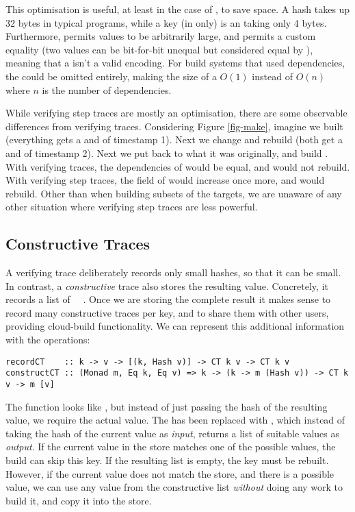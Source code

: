 This optimisation is useful, at least in the case of \Shake, to save space. A hash takes up 32 bytes in typical programs, while a key (in \Shake only) is an  taking only 4 bytes. Furthermore, \Shake permits values to be arbitrarily large, and permits a custom equality (two values can be bit-for-bit unequal but considered equal by \Shake), meaning that a  isn't a valid encoding. For build systems that used  dependencies, the  could be omitted entirely, making the size of a  $O(1)$ instead of $O(n)$ where $n$ is the number of dependencies.

While verifying step traces are mostly an optimisation, there are some observable differences from verifying traces. Considering Figure \ref{fig-make}, imagine we built  (everything gets a  and  of timestamp 1). Next we change  and rebuild  (both get a  and  of timestamp 2). Next we put  back to what it was originally, and build . With verifying traces, the dependencies of  would be equal, and  would not rebuild. With verifying step traces, the  field of  would increase once more, and  would rebuild. Other than when building subsets of the targets, we are unaware of any other situation where verifying step traces are less powerful.

\subsection{Constructive Traces}\label{sec-constructive-traces}

A verifying trace deliberately records only small hashes, so that it can be small.
In contrast, a \emph{constructive} trace also stores the resulting value. Concretely,
it records a list of ~~.
Once we are storing the complete result it makes sense
to record many constructive traces per key, and to share them with other users,
providing cloud-build functionality. We can represent this additional
information with the operations:

\begin{verbatim}
recordCT    :: k -> v -> [(k, Hash v)] -> CT k v -> CT k v
constructCT :: (Monad m, Eq k, Eq v) => k -> (k -> m (Hash v)) -> CT k v -> m [v]
\end{verbatim}

\noindent
The function  looks like , but instead of just passing
the hash of the resulting value, we require the actual value. The 
has been replaced with , which instead of taking the hash of the
current value as \emph{input}, returns a list of suitable values as \emph{output}.
If the current value in the store matches one of the possible values, the build
can skip this key. If the resulting list is empty, the key must be rebuilt.
However, if the current value does not match the store, and there is a possible
value, we can use any value from the constructive list \emph{without} doing any
work to build it, and copy it into the store.

